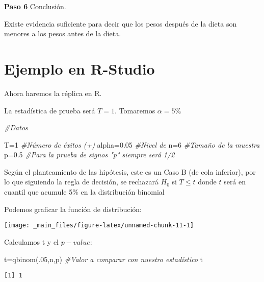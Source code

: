 \documentclass[
  a4paper,
  oneside,
  openany]{book}
\newenvironment{Shaded}{\begin{snugshade}}{\end{snugshade}}
\newcommand{\CommentTok}[1]{\textcolor[rgb]{0.56,0.35,0.01}{\textit{#1}}}
\newcommand{\DecValTok}[1]{\textcolor[rgb]{0.00,0.00,0.81}{#1}}
\newcommand{\FloatTok}[1]{\textcolor[rgb]{0.00,0.00,0.81}{#1}}
\newcommand{\FunctionTok}[1]{\textcolor[rgb]{0.00,0.00,0.00}{#1}}
\newcommand{\NormalTok}[1]{#1}
\newcommand{\OtherTok}[1]{\textcolor[rgb]{0.56,0.35,0.01}{#1}}
\begin{document}
\textbf{Paso 6} Conclusión.

Existe evidencia suficiente para decir que los pesos después de la dieta son menores a los pesos antes de la dieta.

\hypertarget{ejemplo-en-r-studio-2}{%
\section{Ejemplo en R-Studio}\label{ejemplo-en-r-studio-2}}

Ahora haremos la réplica en R.

La estadística de prueba será \(T=1\). Tomaremos \(\alpha=5\%\)

\begin{Shaded}
\begin{Highlighting}[]
\CommentTok{\#Datos}

\NormalTok{T}\OtherTok{=}\DecValTok{1}              \CommentTok{\#Número de éxitos (+)}
\NormalTok{alpha}\OtherTok{=}\FloatTok{0.05}       \CommentTok{\#Nivel de }
\NormalTok{n}\OtherTok{=}\DecValTok{6}              \CommentTok{\#Tamaño de la muestra }
\NormalTok{p}\OtherTok{=}\FloatTok{0.5}            \CommentTok{\#Para la prueba de signos "p" siempre será 1/2}
\end{Highlighting}
\end{Shaded}

Según el planteamiento de las hipótesis, este es un Caso B (de cola inferior), por lo que siguiendo la regla de decisión, se rechazará \(H_0\) si \(T\leq t\) donde \(t\) será en cuantil que acumule 5\% en la distribución binomial

Podemos graficar la función de distribución:

\begin{center}\texttt{[image: \_main\_files/figure-latex/unnamed-chunk-11-1]} \end{center}

Calculamos t y el \(p-value\):

\begin{Shaded}
\begin{Highlighting}[]
\NormalTok{t}\OtherTok{=}\FunctionTok{qbinom}\NormalTok{(.}\DecValTok{05}\NormalTok{,n,p)         }\CommentTok{\#Valor a comparar con nuestro estadístico}
\NormalTok{t}
\end{Highlighting}
\end{Shaded}

\begin{verbatim}
[1] 1
\end{verbatim}
\end{document}
